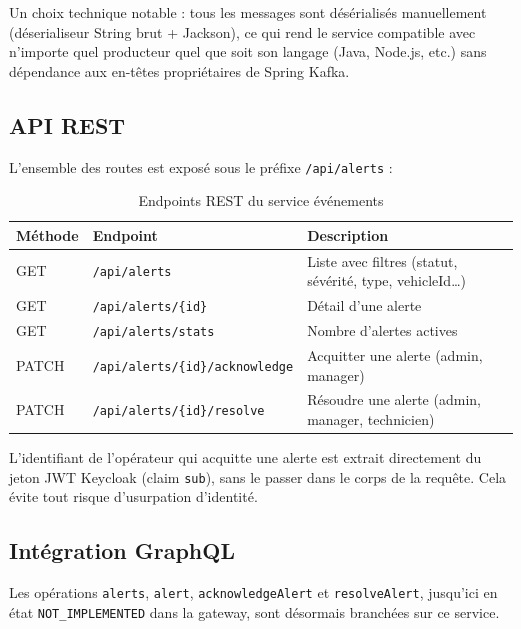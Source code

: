 \documentclass[12pt,a4paper]{article}
\begin{document}
Un choix technique notable : tous les messages sont d\'{e}s\'{e}rialis\'{e}s manuellement (d\'{e}serialiseur String brut + Jackson), ce qui rend le service compatible avec n'importe quel producteur quel que soit son langage (Java, Node.js, etc.) sans d\'{e}pendance aux en-t\^{e}tes propri\'{e}taires de Spring Kafka.

\subsection{API REST}

L'ensemble des routes est expos\'{e} sous le pr\'{e}fixe \texttt{/api/alerts} :

\begin{table}[H]
\centering
\small
\begin{tabular}{|l|l|l|}
  \hline
  \rowcolor{primary!15}
  \textbf{M\'{e}thode} & \textbf{Endpoint} & \textbf{Description} \\
  \hline
  GET   & \texttt{/api/alerts}                     & Liste avec filtres (statut, s\'{e}v\'{e}rit\'{e}, type, vehicleId\ldots) \\
  GET   & \texttt{/api/alerts/\{id\}}              & D\'{e}tail d'une alerte \\
  GET   & \texttt{/api/alerts/stats}               & Nombre d'alertes actives \\
  PATCH & \texttt{/api/alerts/\{id\}/acknowledge}  & Acquitter une alerte (admin, manager) \\
  PATCH & \texttt{/api/alerts/\{id\}/resolve}      & R\'{e}soudre une alerte (admin, manager, technicien) \\
  \hline
\end{tabular}
\caption{Endpoints REST du service \'{e}v\'{e}nements}
\end{table}

L'identifiant de l'op\'{e}rateur qui acquitte une alerte est extrait directement du jeton JWT Keycloak (claim \texttt{sub}), sans le passer dans le corps de la requ\^{e}te. Cela \'{e}vite tout risque d'usurpation d'identit\'{e}.

\subsection{Int\'{e}gration GraphQL}

Les op\'{e}rations \texttt{alerts}, \texttt{alert}, \texttt{acknowledgeAlert} et \texttt{resolveAlert}, jusqu'ici en \'{e}tat \texttt{NOT\_IMPLEMENTED} dans la gateway, sont d\'{e}sormais branch\'{e}es sur ce service.
\end{document}
